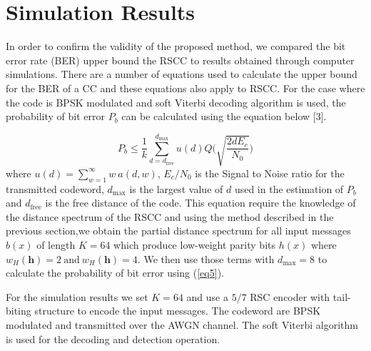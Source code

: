 \documentclass[fontsize=12pt]{article}
\begin{document}
\section{Simulation Results}
\label{sec5}

In order to confirm the validity of the proposed method, we compared the bit error rate (BER) upper bound the RSCC to results obtained through computer simulations. 
There are a number of equations used to calculate the upper bound for the BER of a CC and these equations also apply to RSCC. For the case where the code is BPSK modulated and soft Viterbi decoding algorithm is used, the probability of bit error $P_b$ can be calculated using the equation below [3].

\begin{equation}
P_b \leq \frac{1}{k} \sum_{d=d_{\text{free}}}^{d_{\text{max}}} u(d) Q\Bigg( \sqrt{\frac{2dE_c}{N_0}}\Bigg)
\label{eq5}
\end{equation}
where $u(d)=\sum_{w=1}^{\infty} w~ a(d,w)$,  $E_c/N_0$ is the Signal to Noise ratio for the transmitted codeword, $d_{\text{max}}$ is the largest value of $d$ used in the estimation of $P_b$ and $d_{\text{free}}$ is the free distance of the code. This equation require the knowledge of the distance spectrum of the RSCC and using the method described in the previous section,we obtain the partial distance spectrum for all input messages $b(x)$ of length $K=64$ which produce low-weight parity bits
$h(x)$ where $w_H(\textbf{h})=2 ~\text{and} ~ w_H(\textbf{h})=4$.  We then use those terms with $d_{\text{max}}=8$ to calculate the probability of bit error using (\ref{eq5}). 

For the simulation results we set $K=64$ and use a $5/7$ RSC encoder with tail-biting structure to encode the input messages. The codeword are BPSK modulated and transmitted over the AWGN channel. The soft Viterbi algorithm is used for the decoding and detection operation.
\end{document}
